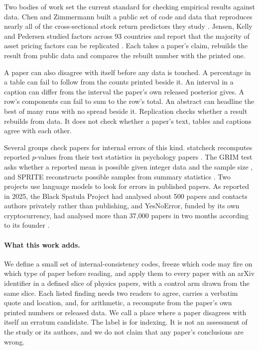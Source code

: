 \documentclass[reprint,amsmath,amssymb,aps,superscriptaddress,nofootinbib]{revtex4-2}
\begin{document}
Two bodies of work set the current standard for checking empirical results against data. Chen and Zimmermann built a public set of code and data that reproduces nearly all of the cross-sectional stock return predictors they study \cite{ChenZimmermann2022}. Jensen, Kelly and Pedersen studied factors across 93 countries and report that the majority of asset pricing factors can be replicated \cite{JKP2023}. Each takes a paper's claim, rebuilds the result from public data and compares the rebuilt number with the printed one.

A paper can also disagree with itself before any data is touched. A percentage in a table can fail to follow from the counts printed beside it. An interval in a caption can differ from the interval the paper's own released posterior gives. A row's components can fail to sum to the row's total. An abstract can headline the best of many runs with no spread beside it. Replication checks whether a result rebuilds from data. It does not check whether a paper's text, tables and captions agree with each other.

Several groups check papers for internal errors of this kind. statcheck recomputes reported $p$-values from their test statistics in psychology papers \cite{Nuijten2016}. The GRIM test asks whether a reported mean is possible given integer data and the sample size \cite{BrownHeathers2017}, and SPRITE reconstructs possible samples from summary statistics \cite{Heathers2018}. Two projects use language models to look for errors in published papers. As reported in 2025, the Black Spatula Project had analysed about 500 papers and contacts authors privately rather than publishing, and YesNoError, funded by its own cryptocurrency, had analysed more than 37,000 papers in two months according to its founder \cite{Gibney2025}.

\paragraph*{What this work adds.} We define a small set of internal-consistency codes, freeze which code may fire on which type of paper before reading, and apply them to every paper with an arXiv identifier in a defined slice of physics papers, with a control arm drawn from the same slice. Each listed finding needs two readers to agree, carries a verbatim quote and location, and, for arithmetic, a recompute from the paper's own printed numbers or released data. We call a place where a paper disagrees with itself an erratum candidate. The label is for indexing. It is not an assessment of the study or its authors, and we do not claim that any paper's conclusions are wrong.
\end{document}
